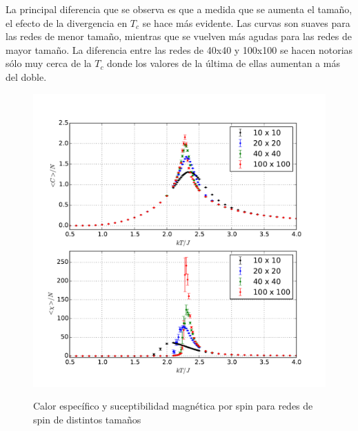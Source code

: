 \documentclass[a4paper,12pt]{article}
\begin{document}
La principal diferencia que se observa es que a medida que se aumenta el 
tamaño, el efecto de la divergencia en $T_c$ se hace más evidente. Las curvas 
son suaves para las redes de menor tamaño, mientras que se vuelven más 
agudas para las redes de mayor tamaño. La diferencia entre las redes de 
40x40 y 100x100 se hacen notorias sólo muy cerca de la $T_c$ donde los valores 
de la última de ellas aumentan a más del doble.

\begin{figure}[H]
    \begin{center}
      \includegraphics[scale=0.7]{tamano_fluctuaciones.pdf} \\
      \caption{Calor específico y suceptibilidad magnética por spin para redes 
      de spin 
      de distintos tamaños}\label{fig:tam_fluctuaciones}
    \end{center}
\end{figure}

\newpage
\end{document}
